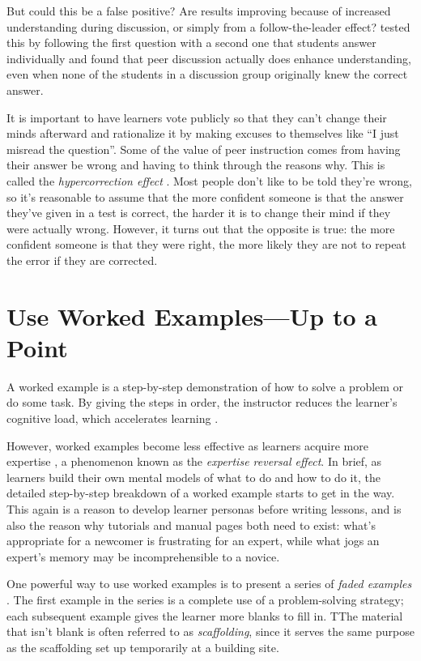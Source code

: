 \documentclass[10pt,letterpaper]{article}
\newcommand{\rulemajor}[1]{\section{#1}}
\begin{document}
But could this be a false positive? Are results improving because of increased
understanding during discussion, or simply from a follow-the-leader effect?
\cite{Smit2009} tested this by following the first question with a second one
that students answer individually and found that peer discussion actually does
enhance understanding, even when none of the students in a discussion group
originally knew the correct answer.

It is important to have learners vote publicly so that they can't change their
minds afterward and rationalize it by making excuses to themselves like ``I just
misread the question''.  Some of the value of peer instruction comes from having
their answer be wrong and having to think through the reasons why.  This is
called the \emph{hypercorrection effect} \cite{Metc2016}. Most people don't like
to be told they're wrong, so it's reasonable to assume that the more confident
someone is that the answer they've given in a test is correct, the harder it is
to change their mind if they were actually wrong.  However, it turns out that
the opposite is true: the more confident someone is that they were right, the
more likely they are not to repeat the error if they are corrected.

\rulemajor{Use Worked Examples---Up to a Point}

A worked example is a step-by-step demonstration of how to solve a problem or do
some task.  By giving the steps in order, the instructor reduces the learner's
cognitive load, which accelerates learning \cite{Atki2000,Paas2003}.

However, worked examples become less effective as learners acquire more
expertise \cite{Kaly2003,Kaly2007}, a phenomenon known as the \emph{expertise
  reversal effect}.  In brief, as learners build their own mental models of what
to do and how to do it, the detailed step-by-step breakdown of a worked example
starts to get in the way.  This again is a reason to develop learner personas
before writing lessons, and is also the reason why tutorials and manual pages
both need to exist: what's appropriate for a newcomer is frustrating for an
expert, while what jogs an expert's memory may be incomprehensible to a novice.

One powerful way to use worked examples is to present a series of \emph{faded
  examples} \cite{Schw2009}.  The first example in the series is a complete use
of a problem-solving strategy; each subsequent example gives the learner more
blanks to fill in. TThe material that isn't blank is often referred to as
\emph{scaffolding}, since it serves the same purpose as the scaffolding set up
temporarily at a building site.
\end{document}
